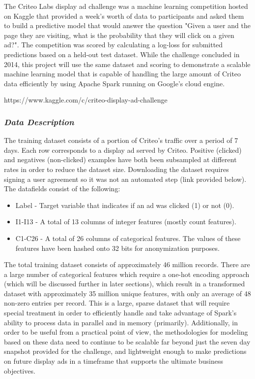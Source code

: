 \documentclass[11pt]{article}
\providecommand{\tightlist}{%
      \setlength{\itemsep}{0pt}\setlength{\parskip}{0pt}}
\begin{document}
The Criteo Labs display ad challenge was a machine learning competition
hosted on Kaggle that provided a week's worth of data to participants
and asked them to build a predictive model that would answer the
question "Given a user and the page they are visiting, what is the
probability that they will click on a given ad?". The competition was
scored by calculating a log-loss for submitted predictions based on a
held-out test dataset. While the challenge concluded in 2014, this
project will use the same dataset and scoring to demonstrate a scalable
machine learning model that is capable of handling the large amount of
Criteo data efficiently by using Apache Spark running on Google's cloud
engine.

https://www.kaggle.com/c/criteo-display-ad-challenge

\subsubsection{\texorpdfstring{\emph{Data
Description}}{Data Description}}\label{data-description}

The training dataset consists of a portion of Criteo's traffic over a
period of 7 days. Each row corresponds to a display ad served by Criteo.
Positive (clicked) and negatives (non-clicked) examples have both been
subsampled at different rates in order to reduce the dataset size.
Downloading the dataset requires signing a user agreement so it was not
an automated step (link provided below). The datafields consist of the
following:

\begin{itemize}
\tightlist
\item
  Label - Target variable that indicates if an ad was clicked (1) or not
  (0).
\item
  I1-I13 - A total of 13 columns of integer features (mostly count
  features).
\item
  C1-C26 - A total of 26 columns of categorical features. The values of
  these features have been hashed onto 32 bits for anonymization
  purposes.
\end{itemize}

The total training dataset consists of approximately 46 million records.
There are a large number of categorical features which require a one-hot
encoding approach (which will be discussed further in later sections),
which result in a transformed dataset with approximately 35 million
unique features, with only an average of 48 non-zero entries per record.
This is a large, sparse dataset that will require special treatment in
order to efficiently handle and take advantage of Spark's ability to
process data in parallel and in memory (primarily). Additionally, in
order to be useful from a practical point of view, the methodologies for
modeling based on these data need to continue to be scalable far beyond
just the seven day snapshot provided for the challenge, and lightweight
enough to make predictions on future display ads in a timeframe that
supports the ultimate business objectives.
\end{document}
